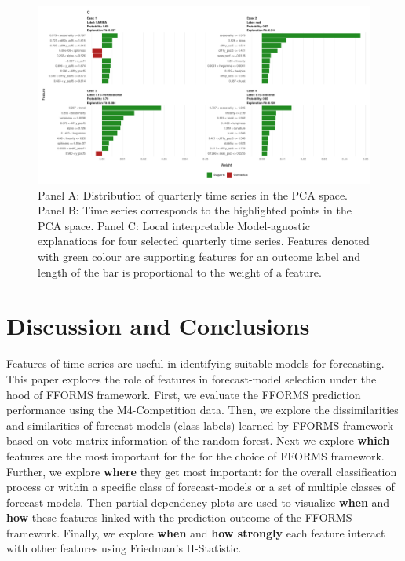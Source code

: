 \documentclass[11pt,a4paper,]{article}
\begin{document}
\begin{figure}[h]

{\centering \includegraphics{figures/quarterlylime2-1} 

}

\caption{Panel A: Distribution of quarterly time series in the PCA space. Panel B: Time series corresponds to the highlighted points in the PCA space. Panel C: Local interpretable Model-agnostic explanations for four selected quarterly time series. Features denoted with green colour are supporting features for an outcome label and length of the bar is proportional to the weight of a feature.}\label{fig:quarterlylime2}
\end{figure}

\hypertarget{conclusions}{%
\section{Discussion and Conclusions}\label{conclusions}}

Features of time series are useful in identifying suitable models for forecasting. This paper explores the role of features in forecast-model selection under the hood of FFORMS framework. First, we evaluate the FFORMS prediction performance using the M4-Competition data. Then, we explore the dissimilarities and similarities of forecast-models (class-labels) learned by FFORMS framework based on vote-matrix information of the random forest. Next we explore \textbf{which} features are the most important for the for the choice of FFORMS framework. Further, we explore \textbf{where} they get most important: for the overall classification process or within a specific class of forecast-models or a set of multiple classes of forecast-models. Then partial dependency plots are used to visualize \textbf{when} and \textbf{how} these features linked with the prediction outcome of the FFORMS framework. Finally, we explore \textbf{when} and \textbf{how strongly} each feature interact with other features using Friedman's H-Statistic.
\end{document}
